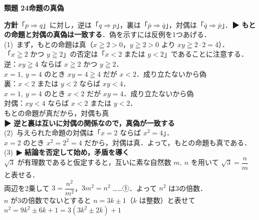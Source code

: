\documentclass[a4paper,11pt]{ltjsarticle}
\newcommand{\ans}[2]{\Needspace{5\baselineskip}\vspace{6pt}%
  {\sffamily\bfseries 類題 #1\quad #2}\par}
\newcommand{\point}[1]{\textsf{\bfseries ▶ #1}}
\begin{document}
\ans{24}{命題の真偽}
\begin{kai}
\textbf{方針}\quad 「$p\Rightarrow q$」に対し，逆は「$q\Rightarrow p$」，裏は「$\overline p\Rightarrow\overline q$」，対偶は「$\overline q\Rightarrow\overline p$」．\point{もとの命題と対偶の真偽は一致する}．偽を示すには反例を1つあげる．\\[2pt]
(1)\ まず，もとの命題は真（$x\geqq2>0$，$y\geqq2>0$ より $xy\geqq2\cdot2=4$）．\\
\hspace*{1.5em}「$x\geqq2$ かつ $y\geqq2$」の否定は「$x<2$ または $y<2$」であることに注意する．\\[2pt]
\hspace*{1.5em}逆：$xy\geqq4$ ならば $x\geqq2$ かつ $y\geqq2$．\\
\hspace*{3em}$x=1,\ y=4$ のとき $xy=4\geqq4$ だが $x<2$．成り立たないから\quad 偽\\
\hspace*{1.5em}裏：$x<2$ または $y<2$ ならば $xy<4$．\\
\hspace*{3em}$x=1,\ y=4$ のとき $x<2$ だが $xy=4$．成り立たないから\quad 偽\\
\hspace*{1.5em}対偶：$xy<4$ ならば $x<2$ または $y<2$．\\
\hspace*{3em}もとの命題が真だから，対偶も\quad 真\\
\hspace*{1.5em}\point{逆と裏は互いに対偶の関係なので，真偽が一致する}\\[2pt]
(2)\ 与えられた命題の対偶は「$x=2$ ならば $x^2=4$」．\\
\hspace*{1.5em}$x=2$ のとき $x^2=2^2=4$ だから，対偶は真．よって，もとの命題も真である．\\[2pt]
(3)\ \point{結論を否定して始め，矛盾を導く}\\
\hspace*{1.5em}$\sqrt3$ が有理数であると仮定すると，互いに素な自然数 $m,\ n$ を用いて $\sqrt3=\dfrac nm$ と表せる．\\
\hspace*{1.5em}両辺を2乗して $3=\dfrac{n^2}{m^2}$，\quad $3m^2=n^2$ ……①．よって $n^2$ は3の倍数．\\
\hspace*{1.5em}$n$ が3の倍数でないとすると $n=3k\pm1$（$k$ は整数）と表せて\\
\hspace*{3em}$n^2=9k^2\pm6k+1=3(3k^2\pm2k)+1$\\

\end{kai}
\end{document}
